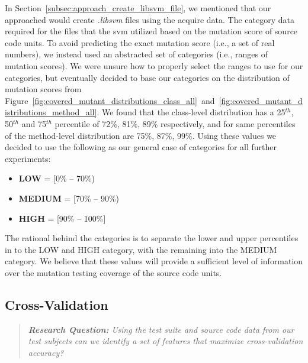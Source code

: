 In Section~\ref{subsec:approach_create_libsvm_file}, we mentioned that our approached would create \emph{.libsvm} files using the acquire data. The category data required for the files that the \gls{svm} utilized based on the mutation score of source code units. To avoid predicting the exact mutation score (i.e., a set of real numbers), we instead used an abstracted set of categories (i.e., ranges of mutation scores). We were unsure how to properly select the ranges to use for our categories, but eventually decided to base our categories on the distribution of mutation scores from Figure~\ref{fig:covered_mutant_distributions_class_all}~and~\ref{fig:covered_mutant_distributions_method_all}. We found that the class-level distribution has a 25$^{th}$, 50$^{th}$ and 75$^{th}$ percentile of 72\%, 81\%, 89\% respectively, and for same percentiles of the method-level distribution are 75\%, 87\%, 99\%. Using these values we decided to use the following as our general case of categories for all further experiments:

\begin{itemize}
  \item \textbf{LOW} = [0\% -- 70\%)
  \item \textbf{MEDIUM} = [70\% -- 90\%)
  \item \textbf{HIGH} = [90\% -- 100\%]
\end{itemize}

The rational behind the categories is to separate the lower and upper percentiles in to the LOW and HIGH category, with the remaining into the MEDIUM category. We believe that these values will provide a sufficient level of information over the mutation testing coverage of the source code units.


\subsection{Cross-Validation}
\label{subsec:experiment_cross_validation}
\begin{quote}
  \emph{\textbf{Research Question:} Using the test suite and source code data from our test subjects can we identify a set of features that maximize cross-validation accuracy?}
\end{quote}

